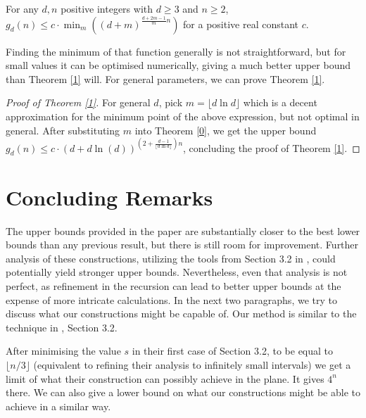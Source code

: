 \documentclass[a4paper,UKenglish,cleveref, autoref, thm-restate]{lipics-v2021}
\begin{document}
\begin{corollary}
    For any $d,n$ positive integers with $d\geq3$ and $n\geq2$,\\ $g_d(n)\leq c\cdot \min_m((d+m)^{\frac{d+2m-1}{m}n})$ for a positive real constant $c$.
\end{corollary}

 Finding the minimum of that function generally is not straightforward, but for small values it can be optimised numerically, giving a much better upper bound than Theorem \ref{1} will. For general parameters, we can prove Theorem \ref{1}.

\begin{proof}[Proof of Theorem \ref{1}]
For general $d$, pick $m=\lfloor d\ln{d}\rfloor$ which is a decent approximation for the minimum point of the above expression, but not optimal in general. After substituting $m$ into Theorem \ref{0}, we get the upper bound \\
 $g_d(n)\leq c\cdot(d+d\ln{(d)})^{(2+\frac{d-1}{\lfloor d\ln{d}\rfloor})n}$, concluding the proof of Theorem \ref{1}.
\end{proof}


    \section{Concluding Remarks}

    The upper bounds provided in the paper are substantially closer to the best lower bounds than any previous result, but there is still room for improvement. Further analysis of these constructions, utilizing the tools from Section 3.2 in \cite{Dumitrescu}, could potentially yield stronger upper bounds. Nevertheless, even that analysis is not perfect, as refinement in the recursion can lead to better upper bounds at the expense of more intricate calculations. In the next two paragraphs, we try to discuss what our constructions might be capable of. Our method is similar to the technique in \cite{Dumitrescu}, Section 3.2.
    
 After minimising the value $s$ in their first case of Section 3.2, to be equal to $\lfloor n/3\rfloor$ (equivalent to refining their analysis to infinitely small intervals) we get a limit of what their construction can possibly achieve in the plane. It gives $4^n$ there. We can also give a lower bound on what our constructions might be able to achieve in a similar way. 
\end{document}
